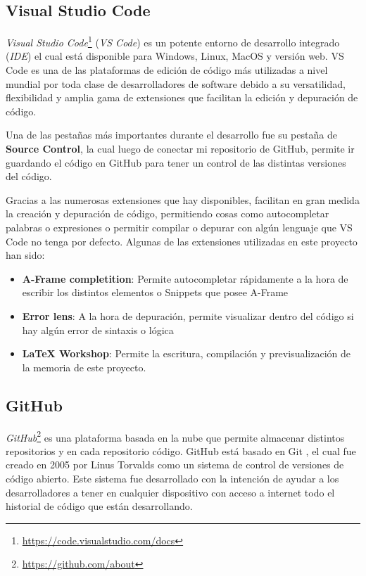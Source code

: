 \documentclass[a4paper, 12pt]{book}
\begin{document}
\subsection{Visual Studio Code}
\label{subsec: visualstudiocode}

\textit{Visual Studio Code}\footnote{\url{https://code.visualstudio.com/docs}} (\textit{VS Code}) es un potente entorno de desarrollo integrado (\textit{IDE}) el cual está disponible para Windows, Linux, MacOS y versión web. VS Code es una de las plataformas de edición de código más utilizadas a nivel mundial 
por toda clase de desarrolladores de software debido a su versatilidad, flexibilidad y amplia gama de extensiones que facilitan la edición y depuración de código.

Una de las pestañas más importantes durante el desarrollo fue su pestaña de \textbf{Source Control}, la cual luego de conectar mi repositorio de GitHub, permite ir guardando el código en GitHub para tener un control de las distintas versiones del código. 

Gracias a las numerosas extensiones que hay disponibles, facilitan en gran medida la creación y depuración de código, permitiendo cosas como autocompletar palabras o expresiones o permitir compilar o depurar con algún lenguaje que VS Code no tenga por defecto.
Algunas de las extensiones utilizadas en este proyecto han sido: 
\begin{itemize}
  \item \textbf{A-Frame completition}: Permite autocompletar rápidamente a la hora de escribir los distintos elementos o Snippets que posee A-Frame
  \item \textbf{Error lens}: A la hora de depuración, permite visualizar dentro del código si hay algún error de sintaxis o lógica 
  \item \textbf{LaTeX Workshop}: Permite la escritura, compilación y previsualización de la memoria de este proyecto.
\end{itemize}

\subsection{GitHub}
\label{subsect:github}

\textit{GitHub}\footnote{\url{https://github.com/about}} es una plataforma basada en la nube que permite almacenar distintos repositorios y en cada repositorio código. GitHub está basado en Git \cite{git}, el cual fue creado en 2005 por Linus Torvalds como un sistema de control de versiones de código abierto.
Este sistema fue desarrollado con la intención de ayudar a los desarrolladores a tener en cualquier dispositivo con acceso a internet todo el historial de código que están desarrollando. 
\end{document}

